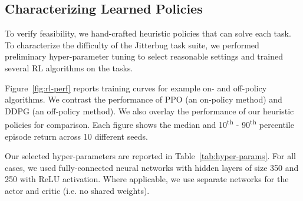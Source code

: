 \documentclass[letterpaper, 10 pt, conference]{ieeeconf}
\newcommand{\rowstyle}[1]{\gdef\currentrowstyle{#1}%
    #1\ignorespaces
}
\begin{document}
\begin{table}[t]
{
    }
    
\end{table}

\subsection{Characterizing Learned Policies}
To verify feasibility, we hand-crafted heuristic policies that can solve each task.
To characterize the difficulty of the Jitterbug task suite, we performed preliminary hyper-parameter tuning to select reasonable settings and trained several RL algorithms on the tasks.


Figure~\ref{fig:rl-perf} reports training curves for example on- and off-policy algorithms.
We contrast the performance of PPO (an on-policy method) and DDPG (an off-policy method).
We also overlay the performance of our heuristic policies for comparison.
Each figure shows the median and 10\textsuperscript{th} - 90\textsuperscript{th} percentile episode return across 10 different seeds.

Our selected hyper-parameters are reported in Table~\ref{tab:hyper-params}.
For all cases, we used fully-connected neural networks with hidden layers of size 350 and 250 with ReLU activation.
Where applicable, we use separate networks for the actor and critic (i.e. no shared weights).
\end{document}
